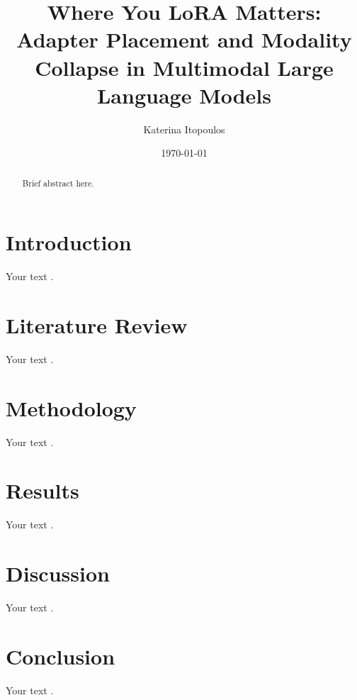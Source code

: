 \documentclass[12pt,a4paper]{report} %
\title{Where You LoRA Matters: Adapter Placement and Modality Collapse in Multimodal Large Language Models}
\author{Katerina Itopoulos}
\date{\today}
\begin{document}
\maketitle
\begin{abstract}
Brief abstract here.
\end{abstract}

\tableofcontents

\chapter{Introduction}
Your text \cite{lamport1994latex}.

\chapter{Literature Review}
Your text \cite{lamport1994latex}.

\chapter{Methodology}
Your text \cite{lamport1994latex}.


\chapter{Results}
Your text \cite{lamport1994latex}.


\chapter{Discussion}
Your text \cite{lamport1994latex}.

\chapter{Conclusion}
Your text \cite{lamport1994latex}.

\printbibliography
\end{document}
